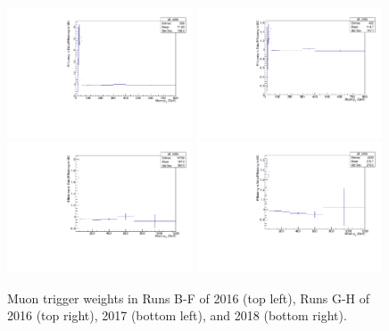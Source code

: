 \begin{figure}[h!]\begin{center}
    \includegraphics[width=0.49\textwidth]{figures/Run2016BtoF_MuonHLTsf.pdf}
    \includegraphics[width=0.49\textwidth]{figures/Run2016GtoH_MuonHLTsf.pdf}\\
    \includegraphics[width=0.49\textwidth]{figures/Run2017_MuonHLTsf.pdf}
    \includegraphics[width=0.49\textwidth]{figures/Run2018_MuonHLTsf.pdf}
    \caption{Muon trigger weights in Runs B-F of 2016 (top left), Runs G-H of 2016 (top right), 2017 (bottom left), and 2018 (bottom right).}
 \label{fig:MuonHLTweights}
 \end{center}
 \end{figure}

